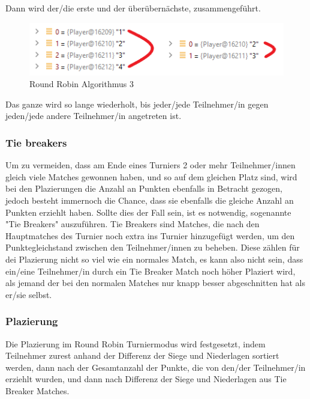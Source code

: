 Dann wird der/die erste und der überübernächste, zusammengeführt.

\begin{figure}[H]
    \includegraphics[scale=0.8]{pics/backend/roundrobin/matching_up_3.png}
    \caption{Round Robin Algorithmus 3}
\end{figure}

Das ganze wird so lange wiederholt, bis jeder/jede Teilnehmer/in gegen jeden/jede andere Teilnehmer/in angetreten ist.

\subsubsection{Tie breakers}

Um zu vermeiden, dass am Ende eines Turniers 2 oder mehr Teilnehmer/innen gleich viele Matches gewonnen haben, und so auf dem gleichen Platz sind, 
wird bei den Plazierungen die Anzahl an Punkten ebenfalls in Betracht gezogen, jedoch besteht immernoch die Chance, dass sie ebenfalls die gleiche Anzahl an 
Punkten erziehlt haben. Sollte dies der Fall sein, ist es notwendig, sogenannte "Tie Breakers" auszuführen. Tie Breakers sind Matches, die nach den Hauptmatches 
des Turnier noch extra ins Turnier hinzugefügt werden, um den Punktegleichstand zwischen den Teilnehmer/innen zu beheben. Diese zählen für dei Plazierung nicht 
so viel wie ein normales Match, es kann also nicht sein, dass ein/eine Teilnehmer/in durch ein Tie Breaker Match noch höher Plaziert wird, als jemand der bei den 
normalen Matches nur knapp besser abgeschnitten hat als er/sie selbst.

\subsubsection{Plazierung}

Die Plazierung im Round Robin Turniermodus wird festgesetzt, indem Teilnehmer zurest anhand der Differenz der Siege und Niederlagen sortiert werden, dann nach 
der Gesamtanzahl der Punkte, die von den/der Teilnehmer/in erziehlt wurden, und dann nach Differenz der Siege und Niederlagen aus Tie Breaker Matches.

